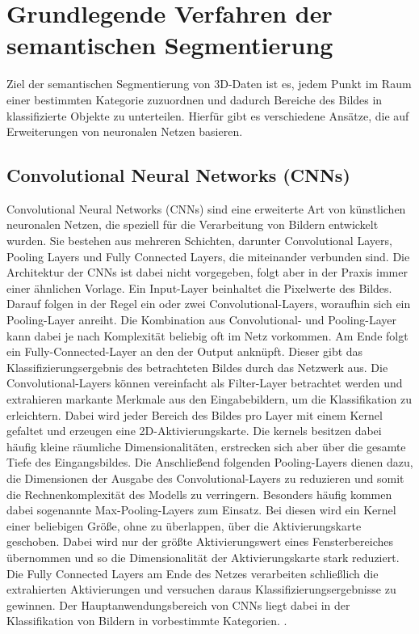 \chapter{Grundlegende Verfahren der semantischen Segmentierung}

Ziel der semantischen Segmentierung von 3D-Daten ist es, jedem Punkt im Raum
einer bestimmten Kategorie zuzuordnen und dadurch Bereiche des Bildes in
klassifizierte Objekte zu unterteilen. Hierfür gibt es verschiedene Ansätze,
die auf Erweiterungen von neuronalen Netzen basieren.

\section{Convolutional Neural Networks (CNNs)}
Convolutional Neural Networks (CNNs) sind eine erweiterte Art von künstlichen
neuronalen Netzen, die speziell für die Verarbeitung von Bildern entwickelt
wurden. Sie bestehen aus mehreren Schichten, darunter Convolutional Layers,
Pooling Layers und Fully Connected Layers, die miteinander verbunden sind. Die
Architektur der CNNs ist dabei nicht vorgegeben, folgt aber in der Praxis immer
einer ähnlichen Vorlage. Ein Input-Layer beinhaltet die Pixelwerte des Bildes.
Darauf folgen in der Regel ein oder zwei Convolutional-Layers, woraufhin sich
ein Pooling-Layer anreiht. Die Kombination aus Convolutional- und Pooling-Layer
kann dabei je nach Komplexität beliebig oft im Netz vorkommen. Am Ende folgt
ein Fully-Connected-Layer an den der Output anknüpft. Dieser gibt das
Klassifizierungsergebnis des betrachteten Bildes durch das Netzwerk aus. Die
Convolutional-Layers können vereinfacht als Filter-Layer betrachtet werden und
extrahieren markante Merkmale aus den Eingabebildern, um die Klassifikation zu
erleichtern. Dabei wird jeder Bereich des Bildes pro Layer mit einem Kernel
gefaltet und erzeugen eine 2D-Aktivierungskarte. Die kernels besitzen dabei
häufig kleine räumliche Dimensionalitäten, erstrecken sich aber über die
gesamte Tiefe des Eingangsbildes. Die Anschließend folgenden Pooling-Layers
dienen dazu, die Dimensionen der Ausgabe des Convolutional-Layers zu reduzieren
und somit die Rechnenkomplexität des Modells zu verringern. Besonders häufig
kommen dabei sogenannte Max-Pooling-Layers zum Einsatz. Bei diesen wird ein
Kernel einer beliebigen Größe, ohne zu überlappen, über die Aktivierungskarte
geschoben. Dabei wird nur der größte Aktivierungswert eines Fensterbereiches
übernommen und so die Dimensionalität der Aktivierungskarte stark reduziert.
Die Fully Connected Layers am Ende des Netzes verarbeiten schließlich die
extrahierten Aktivierungen und versuchen daraus Klassifizierungsergebnisse zu
gewinnen. Der Hauptanwendungsbereich von CNNs liegt dabei in der Klassifikation
von Bildern in vorbestimmte Kategorien. \cite{11262015}.

